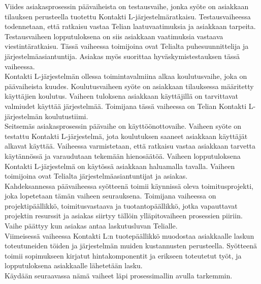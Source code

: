 \documentclass[finnish,12pt,a4paper,pdftex]{article}
\begin{document}
\noindent Viides asiakasprosessin päävaiheista on testausvaihe, jonka syöte on asiakkaan tilauksen perusteella tuotettu Kontakti L-järjestelmäratkaisu. Testausvaiheessa todennetaan, että ratkaisu vastaa Telian laatuvaatimuksia ja asiakkaan tarpeita. Testausvaiheen lopputuloksena on siis asiakkaan vaatimuksia vastaava viestintäratkaisu. Tässä vaiheessa toimijoina ovat Telialta puhesuunnittelija ja järjestelmäasiantuntija. Asiakas myös suorittaa hyväskymistestauksen tässä vaiheessa.\\

\noindent Kontakti L-järjestelmän ollessa toimintavalmiina alkaa koulutusvaihe, joka on päävaiheista kuudes. Koulutusvaiheen syöte on asiakkaan tilauksessa määritetty käyttäjien koulutus. Vaiheen tuloksena asiakkaan käyttäjillä on tarvittavat valmiudet käyttää järjestelmää. Toimijana tässä vaiheessa on Telian Kontakti L-järjestelmän koulutustiimi.\\

\noindent Seitsemäs asiakasprosessin päävaihe on käyttöönottovaihe. Vaiheen syöte on testattu Kontakti L-järjestelmä, jota koulutuksen saaneet asiakkaan käyttäjät alkavat käyttää. Vaiheessa varmistetaan, että ratkaisu vastaa asiakkaan tarvetta käytännössä ja varaudutaan tekemään hienosäätöä. Vaiheen lopputuloksena Kontakti L-järjestelmä on käytössä asiakkaan haluamalla tavalla. Vaiheen toimijoina ovat Telialta järjestelmäasiantuntijat ja asiakas.\\

\noindent Kahdeksannessa päävaiheessa syötteenä toimii käynnissä oleva toimitusprojekti, joka lopetetaan tämän vaiheen seurauksena. Toimijana vaiheessa on projektipäällikkö, toimitusvastaava ja tuotantopäällikkö, jotka vapauttavat projektin resurssit ja asiakas siirtyy tällöin ylläpitovaiheen prosessien piiriin. Vaihe päättyy kun asiakas antaa laskutusluvan Telialle.\\

\noindent Viimeisessä vaiheessa Kontakti L:n tuotepäällikkö muodostaa asiakkaalle laskun toteutuneiden töiden ja järjestelmän muiden kustannusten perusteella. Syötteenä toimii sopimukseen kirjatut hintakomponentit ja erikseen toteutetut työt, ja lopputuloksena asiakkaalle lähetetään lasku.\\

Käydään seuraavassa nämä vaiheet läpi prosessimallin avulla tarkemmin.
\end{document}
